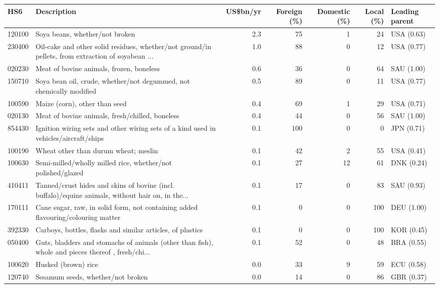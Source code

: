 \begin{tabular}{@{}l p{6.4cm} r r r r l@{}}
\toprule
HS6 & Description & US\$bn/yr & Foreign (\%) & Domestic (\%) & Local (\%) & Leading parent \\
\midrule
120100 & Soya beans, whether/\allowbreak{}not broken & 2.3 & 75 & 1 & 24 & USA (0.63) \\
230400 & Oil-cake and other solid residues, whether/\allowbreak{}not ground/\allowbreak{}in pellets, from extraction of soyabean ... & 1.0 & 88 & 0 & 12 & USA (0.77) \\
020230 & Meat of bovine animals, frozen, boneless & 0.6 & 36 & 0 & 64 & SAU (1.00) \\
150710 & Soya bean oil, crude, whether/\allowbreak{}not degummed, not chemically modified & 0.5 & 89 & 0 & 11 & USA (0.77) \\
100590 & Maize (corn), other than seed & 0.4 & 69 & 1 & 29 & USA (0.71) \\
020130 & Meat of bovine animals, fresh/\allowbreak{}chilled, boneless & 0.4 & 44 & 0 & 56 & SAU (1.00) \\
854430 & Ignition wiring sets and other wiring sets of a kind used in vehicles/\allowbreak{}aircraft/\allowbreak{}ships & 0.1 & 100 & 0 & 0 & JPN (0.71) \\
100190 & Wheat other than durum wheat; meslin & 0.1 & 42 & 2 & 55 & USA (0.41) \\
100630 & Semi-milled/\allowbreak{}wholly milled rice, whether/\allowbreak{}not polished/\allowbreak{}glazed & 0.1 & 27 & 12 & 61 & DNK (0.24) \\
410411 & Tanned/\allowbreak{}crust hides and skins of bovine (incl. buffalo)/\allowbreak{}equine animals, without hair on, in the... & 0.1 & 17 & 0 & 83 & SAU (0.93) \\
170111 & Cane sugar, raw, in solid form, not containing added flavouring/\allowbreak{}colouring matter & 0.1 & 0 & 0 & 100 & DEU (1.00) \\
392330 & Carboys, bottles, flasks and similar articles, of plastics & 0.1 & 0 & 0 & 100 & KOR (0.45) \\
050400 & Guts, bladders and stomachs of animals (other than fish), whole and pieces thereof , fresh/\allowbreak{}chi... & 0.1 & 52 & 0 & 48 & BRA (0.55) \\
100620 & Husked (brown) rice & 0.0 & 33 & 9 & 59 & ECU (0.58) \\
120740 & Sesamum seeds, whether/\allowbreak{}not broken & 0.0 & 14 & 0 & 86 & GBR (0.37) \\
\bottomrule
\end{tabular}
